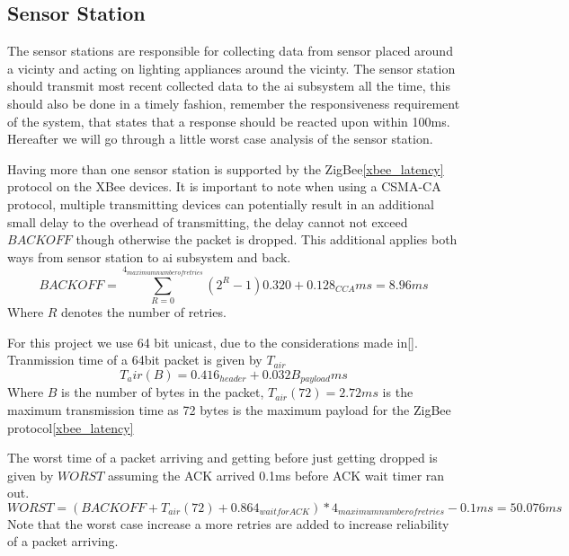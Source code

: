 \subsection{Sensor Station}\label{sub:sensorStation}

The sensor stations are responsible for collecting data from sensor placed around a vicinty and acting on lighting appliances around the vicinty. The sensor station should transmit most recent collected data to the ai subsystem all the time, this should also be done in a timely fashion, remember the responsiveness requirement of the system, that states that a response should be reacted upon within 100ms. Hereafter we will go through a little worst case analysis of the sensor station.

Having more than one sensor station is supported by the ZigBee\cref{xbee_latency} protocol on the XBee devices. It is important to note when using a CSMA-CA protocol, multiple transmitting devices can potentially result in an additional small delay to the overhead of transmitting, the delay cannot not exceed $BACKOFF$ though otherwise the packet is dropped. This additional applies both ways from sensor station to ai subsystem and back.
\begin{equation*}
BACKOFF = \sum\limits_{R=0}^{4_{maximum number of retries}}(2^{R} - 1) 0.320 + 0.128_{CCA} ms = 8.96 ms
\end{equation*}
Where $R$ denotes the number of retries.

For this project we use 64 bit unicast, due to the considerations made in\cref{}.
Tranmission time of a 64bit packet is given by $T_{air}$
\begin{equation*}
T_air(B) = 0.416_{header} + 0.032B_{payload} ms
\end{equation*}
Where $B$ is the number of bytes in the packet, $T_{air}(72) = 2.72 ms$ is the maximum transmission time as 72 bytes is the maximum payload for the ZigBee protocol\cref{xbee_latency}

The worst time of a packet arriving and getting before just getting dropped is given by $WORST$ assuming the ACK arrived 0.1ms before ACK wait timer ran out.
\begin{equation*}
WORST = (BACKOFF + T_{air}(72) + 0.864_{wait for ACK})*4_{maximum number of retries} - 0.1 ms = 50.076 ms
\end{equation*}
Note that the worst case increase a more retries are added to increase reliability of a packet arriving.

